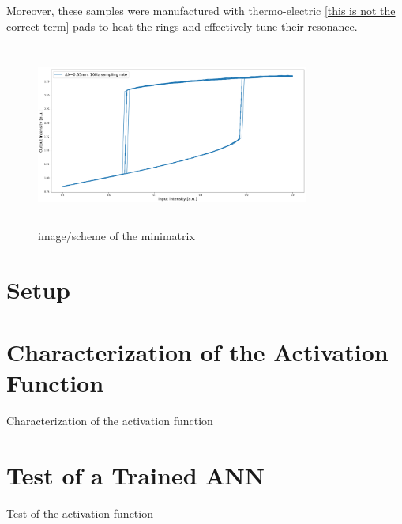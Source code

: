 Moreover, these samples were manufactured with thermo-electric \ref{this is not the correct term} pads to heat the rings and effectively tune their resonance.

\begin{figure}[ht]
	\centering
	\includegraphics[draft,width=9cm,height=6cm]{figures/foo.png}
	\caption{image/scheme of the minimatrix}
	\label{fig:minimatrix_full}
\end{figure}

\section{Setup}

\section{Characterization of the Activation Function}
\label{sec:Characterization_of_the_Activation_Function}
Characterization of the activation function

\section{Test of a Trained ANN}
\label{sec:Test_of_a_Trained ANN}
Test of the activation function